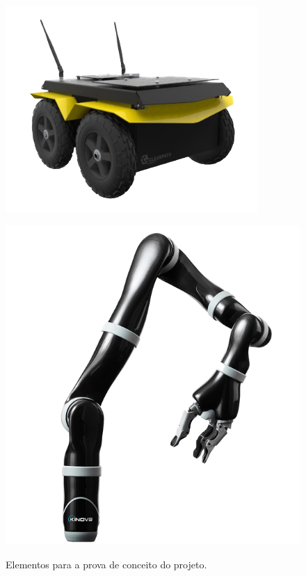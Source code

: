 \begin{figure}[htb]
	\begin{minipage}[b]{.45\linewidth}
		\includegraphics[width=\textwidth]{images/jackal.png}
		\label{fig:pocplat}
	\end{minipage}
	\hfill
	\begin{minipage}[b]{.45\linewidth}
		\includegraphics[width=\textwidth]{images/jaco2.png}
		\label{fig:pocmani}
	\end{minipage}
	\label{fig:poc}
	\caption{Elementos para a prova de conceito do projeto.}
\end{figure}

